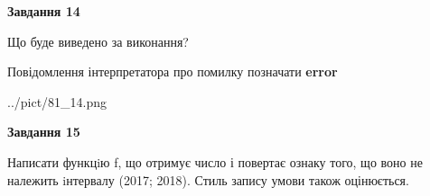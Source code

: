 \documentclass[11pt, ukrainian]{article}
\begin{document}
{\begin {large}
{\begin {center}\textbf{Завдання 14}\end {center}}\par
Що буде виведено за виконання? \par
Повідомлення інтерпретатора про помилку позначати \textbf{error}

\begin{center}
	{../pict/81_14.png}
\end{center}
\newpage

{\begin {center}\textbf{Завдання 15}\end {center}}\par

Написати функцiю f, що отримує число і повертає ознаку того, що воно не належить iнтервалу (2017; 2018). Стиль запису умови також оцінюється.\par
\newpage

\end {large}}
\end{document}
